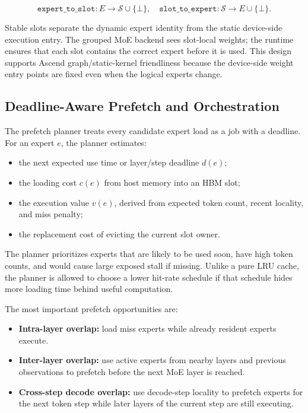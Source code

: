 \documentclass[10pt]{article}
\begin{document}
\[
\texttt{expert\_to\_slot}: E \rightarrow \mathcal{S} \cup \{\bot\},
\quad
\texttt{slot\_to\_expert}: \mathcal{S} \rightarrow E \cup \{\bot\}.
\]

Stable slots separate the dynamic expert identity from the static device-side
execution entry. The grouped MoE backend sees slot-local weights; the runtime
ensures that each slot contains the correct expert before it is used. This
design supports Ascend graph/static-kernel friendliness because the device-side
weight entry points are fixed even when the logical experts change.

\subsection{Deadline-Aware Prefetch and Orchestration}

The prefetch planner treats every candidate expert load as a job with a
deadline. For an expert $e$, the planner estimates:

\begin{itemize}[leftmargin=*]
  \item the next expected use time or layer/step deadline $d(e)$;
  \item the loading cost $c(e)$ from host memory into an HBM slot;
  \item the execution value $v(e)$, derived from expected token count, recent
  locality, and miss penalty;
  \item the replacement cost of evicting the current slot owner.
\end{itemize}

The planner prioritizes experts that are likely to be used soon, have high
token counts, and would cause large exposed stall if missing. Unlike a pure LRU
cache, the planner is allowed to choose a lower hit-rate schedule if that
schedule hides more loading time behind useful computation.

The most important prefetch opportunities are:

\begin{itemize}[leftmargin=*]
  \item \textbf{Intra-layer overlap:} load miss experts while already resident
  experts execute.
  \item \textbf{Inter-layer overlap:} use active experts from nearby layers and
  previous observations to prefetch before the next MoE layer is reached.
  \item \textbf{Cross-step decode overlap:} use decode-step locality to
  prefetch experts for the next token step while later layers of the current
  step are still executing.
\end{itemize}
\end{document}
